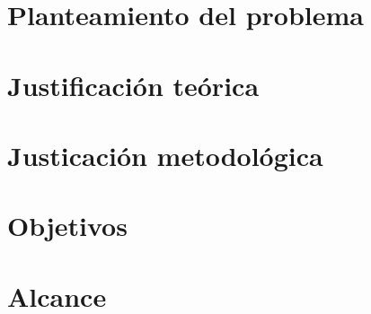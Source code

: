 

\section{Planteamiento del problema}
\label{chapter-01-section-01:Planteamiento-del-Problema}


\section{Justificación teórica}
\label{chapter-01-section-02:Justificacion-Teorica}


%

\section{Justicación metodológica}
\label{chapter-01-section-04:Justificacion-Metodologica}



\section{Objetivos}
\label{chapter01-section01:Objetivos}


\section{Alcance}
\label{chapter01-section02:alcance}


